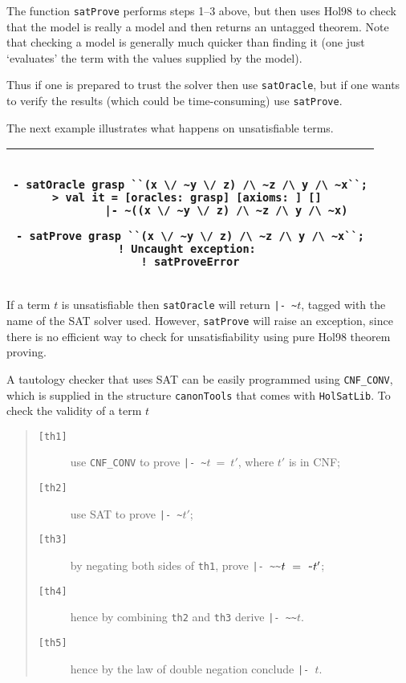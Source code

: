 \documentclass[12pt]{article}
\makeatletter
\renewcommand{\t}[1]{\mbox{\small\tt #1}}
\newcommand\Hol{Hol98\xspace}
\newlength{\hsbw}
\newcommand\MLSpacing{13pt}
\newenvironment{session}{\begin{flushleft}
 \begin{tabular}{@{}|c@{}|@{}}\hline 
 \begin{minipage}[b]{\hsbw}
 \begingroup\small\baselineskip\MLSpacing}{\endgroup\end{minipage}\\ \hline 
 \end{tabular}
 \end{flushleft}}
\makeatother
\begin{document}
The function \t{satProve} performs steps 1--3 above, but then uses
\Hol to check that the model is really a model and then
returns an untagged theorem. Note that checking a model is
generally much quicker than finding it (one just `evaluates' the term
with the values supplied by the model).

Thus if one is prepared to trust the solver then use \t{satOracle},
but if one wants to verify the results (which could be time-consuming)
use \t{satProve}.


The next example illustrates what happens on unsatisfiable terms.

\begin{session}\begin{verbatim}

- satOracle grasp ``(x \/ ~y \/ z) /\ ~z /\ y /\ ~x``;
> val it = [oracles: grasp] [axioms: ] [] 
           |- ~((x \/ ~y \/ z) /\ ~z /\ y /\ ~x)

- satProve grasp ``(x \/ ~y \/ z) /\ ~z /\ y /\ ~x``;
! Uncaught exception: 
! satProveError

\end{verbatim}\end{session}

If a term $t$ is unsatisfiable then \t{satOracle} will return {\small\verb+|- ~+}$t$,
tagged with the name of the SAT solver used. However, \t{satProve} will raise an exception,
since there is no efficient way to check for unsatisfiability using pure \Hol
theorem proving.

A tautology checker that uses SAT can be easily programmed using
\t{CNF\_CONV}, which is supplied in the structure \t{canonTools} that comes
with \t{HolSatLib}. To check the validity of a term $t$

\begin{quote}
\begin{description}
\item[\t{[th1]}] use \t{CNF\_CONV} to prove {\small\verb+|- ~+}$t~=~t'$, where $t'$ is in CNF;
\item[\t{[th2]}] use SAT to prove  {\small\verb+|- ~+}$t'$;
\item[\t{[th3]}] by negating both sides of \t{th1}, prove {\small\verb+|- ~~+}$t~=~{\small\verb+~+}t'$;
\item[\t{[th4]}] hence by combining \t{th2} and \t{th3} derive {\small\verb+|- ~~+}$t$.
\item[\t{[th5]}] hence by the law of double negation conclude {\small\verb+|- +}$t$.
\end{description}
\end{quote}
\end{document}
